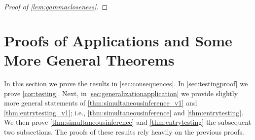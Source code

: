 \documentclass[10pt]{article}
\newcommand{\0}{{\mathbf{0}}}
\newcommand{\1}{{\mathbf{1}}}
\renewcommand{\t}{^{\top}}
\renewcommand{\hat}{\widehat}
\renewcommand{\hat}{\widehat}
\begin{document}
\begin{proof}[Proof of \cref{lem:gammacloseness}]
\end{proof}

\section{Proofs of Applications and Some More General Theorems} \label{sec:applicationproofs}
In this section we prove the results in \cref{sec:consequences}.  In \cref{sec:testingproof} we prove \cref{cor:testing}.  Next, in \cref{sec:generalizationapplication} we provide slightly more general statements of \cref{thm:simultaneousinference_v1} and \cref{thm:entrytesting_v1}; i.e., \cref{thm:simultaneousinference} and \cref{thm:entrytesting}.  We then prove \cref{thm:simultaneousinference} and \cref{thm:entrytesting} the subsequent two subsections.  The proofs of these results rely heavily on the previous proofs.  
\end{document}
